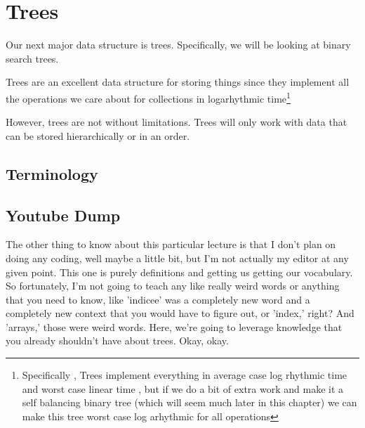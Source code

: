 \chapter{Trees}



Our next major data structure is trees.  Specifically, we will be looking at binary search trees.

Trees are an excellent data structure for storing things since they implement all the operations we care about for collections in logarhythmic time\footnote{Specifically , Trees implement everything in average case log rhythmic time and worst case linear time , but if we do a bit of extra work and make it a self balancing binary tree (which will seem much later in this chapter) we can make this tree worst case log arhythmic for all operations}


However, trees are not without limitations.  Trees will only work with data that can be stored hierarchically or in an order.

\section{Terminology}




\section{Youtube Dump}

The other thing to know about this particular lecture is that I don't plan on doing any coding, well maybe a little bit, but I'm not actually my editor at any given point. This one is purely definitions and getting us getting our vocabulary. So fortunately, I'm not going to teach any like really weird words or anything that you need to know, like 'indicee' was a completely new word and a completely new context that you would have to figure out, or 'index,' right? And 'arrays,' those were weird words. Here, we're going to leverage knowledge that you already shouldn't have about trees. Okay, okay.

